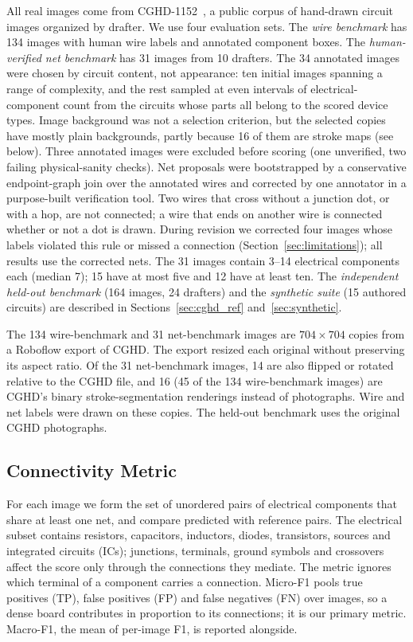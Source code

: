 \documentclass{ieeeaccess}
\begin{document}
All real images come from CGHD-1152~\cite{bayer2021cghd,cghd1152data}, a public corpus of hand-drawn circuit images organized by drafter. We use four evaluation sets. The \emph{wire benchmark} has 134 images with human wire labels and annotated component boxes. The \emph{human-verified net benchmark} has 31 images from 10 drafters. The 34 annotated images were chosen by circuit content, not appearance: ten initial images spanning a range of complexity, and the rest sampled at even intervals of electrical-component count from the circuits whose parts all belong to the scored device types. Image background was not a selection criterion, but the selected copies have mostly plain backgrounds, partly because 16 of them are stroke maps (see below). Three annotated images were excluded before scoring (one unverified, two failing physical-sanity checks). Net proposals were bootstrapped by a conservative endpoint-graph join over the annotated wires and corrected by one annotator in a purpose-built verification tool. Two wires that cross without a junction dot, or with a hop, are not connected; a wire that ends on another wire is connected whether or not a dot is drawn. During revision we corrected four images whose labels violated this rule or missed a connection (Section~\ref{sec:limitations}); all results use the corrected nets. The 31 images contain 3--14 electrical components each (median 7); 15 have at most five and 12 have at least ten. The \emph{independent held-out benchmark} (164 images, 24 drafters) and the \emph{synthetic suite} (15 authored circuits) are described in Sections~\ref{sec:cghd_ref} and~\ref{sec:synthetic}.

The 134 wire-benchmark and 31 net-benchmark images are $704\times704$ copies from a Roboflow export of CGHD. The export resized each original without preserving its aspect ratio. Of the 31 net-benchmark images, 14 are also flipped or rotated relative to the CGHD file, and 16 (45 of the 134 wire-benchmark images) are CGHD's binary stroke-segmentation renderings instead of photographs. Wire and net labels were drawn on these copies. The held-out benchmark uses the original CGHD photographs.

\subsection{Connectivity Metric}

For each image we form the set of unordered pairs of electrical components that share at least one net, and compare predicted with reference pairs. The electrical subset contains resistors, capacitors, inductors, diodes, transistors, sources and integrated circuits (ICs); junctions, terminals, ground symbols and crossovers affect the score only through the connections they mediate. The metric ignores which terminal of a component carries a connection. Micro-F1 pools true positives (TP), false positives (FP) and false negatives (FN) over images, so a dense board contributes in proportion to its connections; it is our primary metric. Macro-F1, the mean of per-image F1, is reported alongside.
\end{document}
